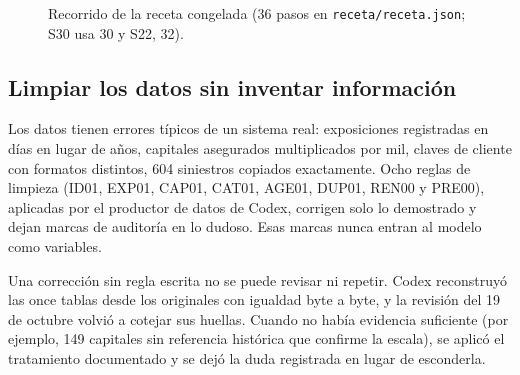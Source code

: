 \documentclass[11pt,a4paper]{article}
\newcommand{\archivo}[1]{\texttt{\small #1}}
\begin{document}
\begin{figure}[H]
\centering
{}
\caption{Recorrido de la receta congelada (36 pasos en \archivo{receta/receta.json}; S30 usa 30 y S22, 32).}
\end{figure}

\subsection{Limpiar los datos sin inventar información}

Los datos tienen errores típicos de un sistema real: exposiciones registradas en días en lugar de años, capitales asegurados multiplicados por mil, claves de cliente con formatos distintos, 604 siniestros copiados exactamente. Ocho reglas de limpieza (ID01, EXP01, CAP01, CAT01, AGE01, DUP01, REN00 y PRE00), aplicadas por el productor de datos de Codex, corrigen solo lo demostrado y dejan marcas de auditoría en lo dudoso. Esas marcas nunca entran al modelo como variables.

\begin{porque}
Una corrección sin regla escrita no se puede revisar ni repetir. Codex reconstruyó las once tablas desde los originales con igualdad byte a byte, y la revisión del 19 de octubre volvió a cotejar sus huellas. Cuando no había evidencia suficiente (por ejemplo, 149 capitales sin referencia histórica que confirme la escala), se aplicó el tratamiento documentado y se dejó la duda registrada en lugar de esconderla.
\end{porque}
\end{document}
